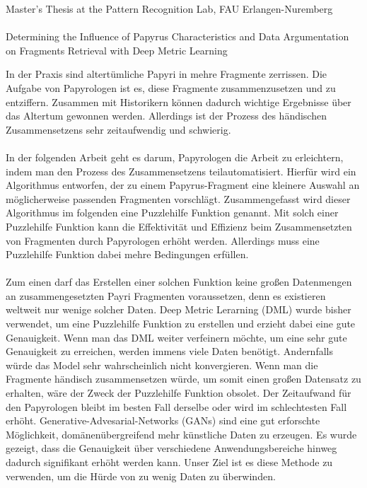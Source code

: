 \documentclass[12pt,a4paper]{article}
\begin{document}
\begin{center}
	Master's Thesis at the Pattern Recognition Lab, FAU Erlangen-Nuremberg \hfill \\[5mm]
																				
	\mbox{}\\
	{\Large Determining the Influence of Papyrus Characteristics and Data Argumentation on Fragments Retrieval with Deep Metric Learning}
			
\end{center}


In der Praxis sind altertümliche Papyri in mehre Fragmente zerrissen. 
Die Aufgabe von Papyrologen ist es, diese Fragmente zusammenzusetzen und zu entziffern. Zusammen mit Historikern können dadurch wichtige Ergebnisse über das Altertum gewonnen werden. Allerdings ist der Prozess des händischen Zusammensetzens sehr zeitaufwendig und schwierig. %
\\\\
In der folgenden Arbeit geht es darum, Papyrologen die Arbeit zu erleichtern, indem man den Prozess des Zusammensetzens teilautomatisiert. %
Hierfür wird ein Algorithmus entworfen, der zu einem Papyrus-Fragment eine kleinere Auswahl an möglicherweise passenden Fragmenten vorschlägt. %
Zusammengefasst wird dieser Algorithmus im folgenden %
eine Puzzlehilfe Funktion genannt. %
Mit solch einer Puzzlehilfe Funktion kann die Effektivität und Effizienz beim Zusammensetzten von Fragmenten durch Papyrologen erhöht werden. %
Allerdings muss eine Puzzlehilfe Funktion dabei mehre Bedingungen erfüllen.
\\\\
Zum einen darf das Erstellen einer solchen Funktion keine großen Datenmengen an zusammengesetzten Payri Fragmenten voraussetzen, denn es existieren weltweit nur wenige solcher Daten. Deep Metric Lerarning (DML) wurde bisher verwendet, um eine Puzzlehilfe Funktion zu erstellen und erzieht %
dabei eine gute Genauigkeit. %
Wenn man das DML weiter verfeinern möchte, um eine sehr gute Genauigkeit zu erreichen, werden immens viele Daten benötigt. Andernfalls würde das Model sehr wahrscheinlich nicht konvergieren. Wenn man die Fragmente händisch zusammensetzen würde, um somit einen großen Datensatz zu erhalten, wäre der Zweck der Puzzlehilfe Funktion obsolet. %
Der Zeitaufwand für den Papyrologen bleibt im besten Fall derselbe oder wird im schlechtesten Fall erhöht. Generative-Advesarial-Networks (GANs) sind eine gut erforschte Möglichkeit, domänenübergreifend mehr künstliche Daten zu erzeugen. Es wurde gezeigt, dass die Genauigkeit über verschiedene Anwendungsbereiche hinweg dadurch signifikant erhöht werden kann. Unser Ziel ist es diese Methode zu verwenden, um die Hürde von zu wenig Daten zu überwinden. %
\end{document}
